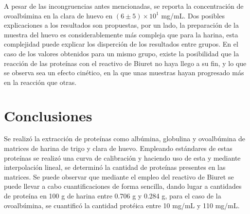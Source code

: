 \documentclass[fleqn,10pt]{SelfArx}
\begin{document}
	A pesar de las incongruencias antes mencionadas, se reporta la concentraci\'on de ovoalb\'umina en la clara de huevo en $(6\pm5)\times10^{1}$ mg/mL. Dos posibles explicaciones a los resultados son propuestas, por un lado, la preparaci\'on de la muestra del huevo es considerablemente m\'as compleja que para la harina, esta complejidad puede explicar los disperci\'on de los resultados entre grupos. En el caso de los valores obtenidos para un mismo grupo, existe la posibilidad que la reacci\'on de las prote\'inas con el reactivo de Biuret no haya llego a su fin, y lo que se observa sea un efecto cin\'etico, en la que unas muestras hayan progresado m\'as en la reacci\'on que otras. 
	
	\newpage

\section{Conclusiones}
	Se realizó la extracción de proteínas como albúmina, globulina y ovoalbúmina de matrices de harina de trigo y clara de huevo. Empleando estándares de estas proteínas se realizó una curva de calibración y haciendo uso de esta y mediante interpolación lineal, se determinó la cantidad de proteínas presentes en las matrices. Se puede observar que mediante el empleo del reactivo de Biuret se puede llevar a cabo cuantificaciones de forma sencilla, dando lugar a cantidades de proteína en 100 g de harina entre 0.706 g y 0.284 g, para el caso de la ovoalbúmina, se cuantificó la cantidad protéica entre 10 mg/mL y 110 mg/mL.
	
	



\end{document}
